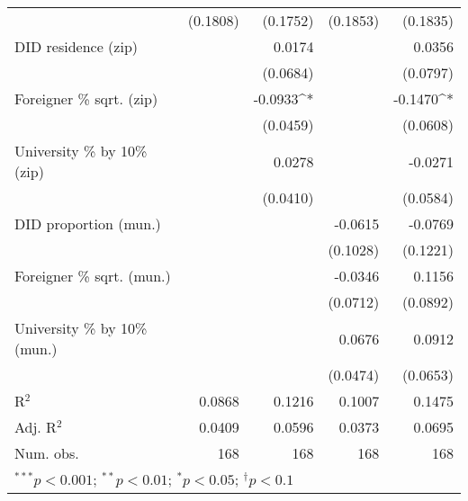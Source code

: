 \begin{tabular}{l D{.}{.}{3.11} D{.}{.}{3.11} D{.}{.}{3.11} D{.}{.}{3.11}}
                                  & (0.1808)          & (0.1752)          & (0.1853)          & (0.1835)          \\
DID residence (zip)               &                   & 0.0174            &                   & 0.0356            \\
                                  &                   & (0.0684)          &                   & (0.0797)          \\
Foreigner \% sqrt. (zip)          &                   & -0.0933^{*}       &                   & -0.1470^{*}       \\
                                  &                   & (0.0459)          &                   & (0.0608)          \\
University \% by 10\% (zip)       &                   & 0.0278            &                   & -0.0271           \\
                                  &                   & (0.0410)          &                   & (0.0584)          \\
DID proportion (mun.)             &                   &                   & -0.0615           & -0.0769           \\
                                  &                   &                   & (0.1028)          & (0.1221)          \\
Foreigner \% sqrt. (mun.)         &                   &                   & -0.0346           & 0.1156            \\
                                  &                   &                   & (0.0712)          & (0.0892)          \\
University \% by 10\% (mun.)      &                   &                   & 0.0676            & 0.0912            \\
                                  &                   &                   & (0.0474)          & (0.0653)          \\
\midrule
R$^2$                             & 0.0868            & 0.1216            & 0.1007            & 0.1475            \\
Adj. R$^2$                        & 0.0409            & 0.0596            & 0.0373            & 0.0695            \\
Num. obs.                         & 168               & 168               & 168               & 168               \\
\bottomrule
{}
\end{tabular}
